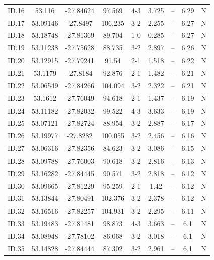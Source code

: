 \begin{table}[!h]
\begin{tabular}{ccccccccc}
ID.16 & 53.116 & -27.84624 & 97.569 & 4-3 & 3.725 & -- & 6.29 & N \\
ID.17 & 53.09146 & -27.8497 & 106.235 & 3-2 & 2.255 & -- & 6.27 & N \\
ID.18 & 53.18748 & -27.81369 & 89.704 & 1-0 & 0.285 & -- & 6.27 & N \\
ID.19 & 53.11238 & -27.75628 & 88.735 & 3-2 & 2.897 & -- & 6.26 & N \\
ID.20 & 53.12915 & -27.79241 & 91.54 & 2-1 & 1.518 & -- & 6.22 & N \\
ID.21 & 53.1179 & -27.8184 & 92.876 & 2-1 & 1.482 & -- & 6.21 & N \\
ID.22 & 53.06549 & -27.84266 & 104.094 & 3-2 & 2.322 & -- & 6.21 & N \\
ID.23 & 53.1612 & -27.76049 & 94.618 & 2-1 & 1.437 & -- & 6.19 & N \\
ID.24 & 53.11182 & -27.82032 & 99.522 & 4-3 & 3.633 & -- & 6.19 & N \\
ID.25 & 53.07121 & -27.82724 & 88.954 & 3-2 & 2.887 & -- & 6.17 & N \\
ID.26 & 53.19977 & -27.8282 & 100.055 & 3-2 & 2.456 & -- & 6.16 & N \\
ID.27 & 53.06316 & -27.82356 & 84.623 & 3-2 & 3.086 & -- & 6.15 & N \\
ID.28 & 53.09788 & -27.76003 & 90.618 & 3-2 & 2.816 & -- & 6.13 & N \\
ID.29 & 53.16282 & -27.84445 & 90.571 & 3-2 & 2.818 & -- & 6.12 & N \\
ID.30 & 53.09665 & -27.81229 & 95.259 & 2-1 & 1.42 & -- & 6.12 & N \\
ID.31 & 53.13844 & -27.80491 & 102.376 & 3-2 & 2.378 & -- & 6.12 & N \\
ID.32 & 53.16516 & -27.82257 & 104.931 & 3-2 & 2.295 & -- & 6.11 & N \\
ID.33 & 53.19483 & -27.81481 & 98.873 & 4-3 & 3.663 & -- & 6.1 & N \\
ID.34 & 53.08948 & -27.78102 & 86.068 & 3-2 & 3.018 & -- & 6.1 & N \\
ID.35 & 53.14828 & -27.84444 & 87.302 & 3-2 & 2.961 & -- & 6.1 & N \\
\end{tabular}
\end{table}\label{table:Catalog}


